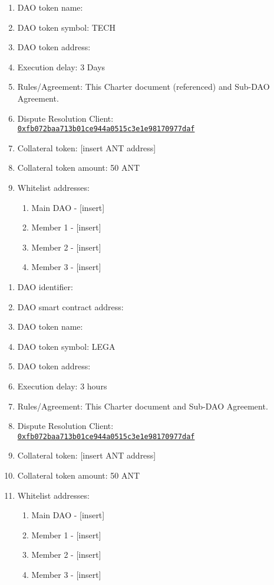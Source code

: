 \begin{itemize}
	\begin{enumerate}[noitemsep]
		\item \ac{DAO} token name:
		\item \ac{DAO} token symbol: TECH
		\item \ac{DAO} token address:
		\item Execution delay: 3 Days
		\item Rules/Agreement: This Charter document (referenced) and Sub-\ac{DAO} Agreement.
		\item Dispute Resolution Client:\\ \href{https://etherscan.io/address/0xfb072baa713b01ce944a0515c3e1e98170977daf}{\texttt{0xfb072baa713b01ce944a0515c3e1e98170977daf}}
		\item Collateral token: [insert \ac{ANT} address]
		\item Collateral token amount: 50 \ac{ANT}
		\item Whitelist addresses:
		\begin{enumerate}
			\item Main \ac{DAO} - [insert]
			\item Member 1 - [insert]
			\item Member 2 - [insert]
			\item Member 3 - [insert]
		\end{enumerate}
	\end{enumerate}

	\begin{enumerate}[noitemsep]
		\item \ac{DAO} identifier:
		\item \ac{DAO} smart contract address:
		\item \ac{DAO} token name:
		\item \ac{DAO} token symbol: LEGA
		\item \ac{DAO} token address:
		\item Execution delay: 3 hours
		\item Rules/Agreement: This Charter document and Sub-\ac{DAO} Agreement.
		\item Dispute Resolution Client:\\ \href{https://etherscan.io/address/0xfb072baa713b01ce944a0515c3e1e98170977daf}{\texttt{0xfb072baa713b01ce944a0515c3e1e98170977daf}}
		\item Collateral token: [insert \ac{ANT} address]
		\item Collateral token amount: 50 \ac{ANT}
		\item Whitelist addresses:
		\begin{enumerate}
			\item Main \ac{DAO} - [insert]
			\item Member 1 - [insert]
			\item Member 2 - [insert]
			\item Member 3 - [insert]
		\end{enumerate}
	\end{enumerate}

\end{itemize}
